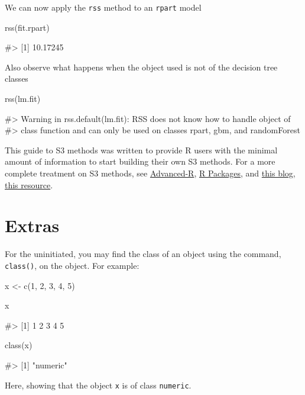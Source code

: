 We can now apply the \texttt{rss} method to an \texttt{rpart} model

\begin{Schunk}
\begin{Sinput}
rss(fit.rpart)
\end{Sinput}
\begin{Soutput}
#> [1] 10.17245
\end{Soutput}
\end{Schunk}

Also observe what happens when the object used is not of the decision
tree classes

\begin{Schunk}
\begin{Sinput}
rss(lm.fit)
\end{Sinput}
\begin{Soutput}
#> Warning in rss.default(lm.fit): RSS does not know how to handle object of
#> class function and can only be used on classes rpart, gbm, and randomForest
\end{Soutput}
\end{Schunk}

This guide to S3 methods was written to provide R users with the minimal
amount of information to start building their own S3 methods. For a more
complete treatment on S3 methods, see \href{}{Advanced-R}, \href{}{R
Packages}, and \href{}{this blog}, \href{}{this resource}.

\section{Extras}\label{extras}

For the uninitiated, you may find the class of an object using the
command, \texttt{class()}, on the object. For example:

\begin{Schunk}
\begin{Sinput}
x <- c(1, 2, 3, 4, 5)

x
\end{Sinput}
\begin{Soutput}
#> [1] 1 2 3 4 5
\end{Soutput}
\begin{Sinput}
class(x)
\end{Sinput}
\begin{Soutput}
#> [1] "numeric"
\end{Soutput}
\end{Schunk}

Here, showing that the object \texttt{x} is of class \texttt{numeric}.

